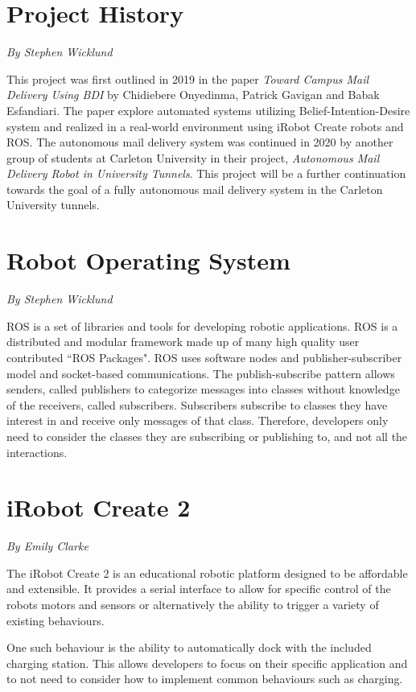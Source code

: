 \documentclass[12pt]{report}
\newcommand{\sectionAuthor}[1]{{\small\vspace{-1em}\textit{#1}}\bigskip\par}
\begin{document}
\section{Project History}
\sectionAuthor{By Stephen Wicklund}
This project was first outlined in 2019 in the paper \textit{Toward Campus Mail Delivery Using BDI}\cite{PatrickPaper} by Chidiebere Onyedinma, Patrick Gavigan and  Babak Esfandiari. The paper explore automated systems utilizing Belief-Intention-Desire system and realized in a real-world environment using iRobot Create robots and ROS. The autonomous mail delivery system was continued in  2020 by another group of students at Carleton University in their project, \textit{Autonomous Mail Delivery Robot in University Tunnels}. This project will be a further continuation towards the goal of a fully autonomous mail delivery system in the Carleton University tunnels.
\section{Robot Operating System}
\sectionAuthor{By Stephen Wicklund}
ROS is a set of libraries and tools for developing robotic applications. ROS is a distributed and modular framework made up of many high quality user contributed ``ROS Packages". ROS uses software nodes and publisher-subscriber model and socket-based communications. The publish-subscribe pattern allows senders, called publishers to categorize messages into classes without knowledge of the receivers, called subscribers. Subscribers subscribe to classes they have interest in and receive only messages of that class. Therefore, developers only need to consider the classes they are subscribing or publishing to, and not all the interactions.
\section{iRobot Create 2}
\sectionAuthor{By Emily Clarke}
The iRobot Create 2 is an educational robotic platform designed to be affordable and extensible. It provides a serial interface to allow for specific control of the robots motors and sensors or alternatively the ability to trigger a variety of existing behaviours. 

One such behaviour is the ability to automatically dock with the included charging station. This allows developers to focus on  their specific application and to not need to consider how to implement common behaviours such as charging.
\end{document}

